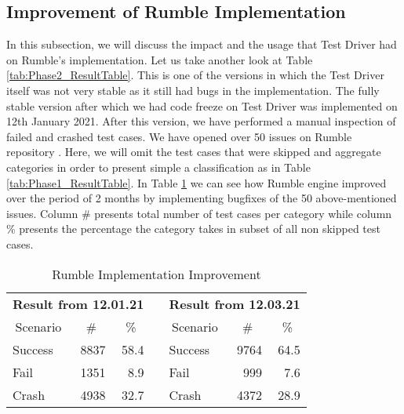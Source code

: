 \subsection{Improvement of Rumble Implementation}
In this subsection, we will discuss the impact and the usage that Test Driver had on Rumble's implementation. Let us take another look at Table \ref{tab:Phase2_ResultTable}. This is one of the versions in which the Test Driver itself was not very stable as it still had bugs in the implementation. The fully stable version after which we had code freeze on Test Driver was implemented on 12th January 2021. After this version, we have performed a manual inspection of failed and crashed test cases. We have opened over 50 issues on Rumble repository \cite{IssuesSubmitted}. Here, we will omit the test cases that were skipped and aggregate categories in order to present simple a classification as in Table \ref{tab:Phase1_ResultTable}. In Table \ref{tab:bugsimprovement} we can see how Rumble engine improved over the period of 2 months by implementing bugfixes of the 50 above-mentioned issues. Column \# presents total number of test cases per category while column \% presents the percentage the category takes in subset of all non skipped test cases.
 
\begin{table}[h!]
	\vspace{-4mm}
	\centering
	\begin{tabular}{|l|r|r|r|l|r|r|}
		\cline{1-3} \cline{5-7}
		\multicolumn{3}{|c|}{\textbf{Result from 12.01.21}}                                & \multicolumn{1}{l|}{}          & \multicolumn{3}{c|}{\textbf{Result from 12.03.21}}                                \\ \cline{1-3} \cline{5-7} 
		\multicolumn{1}{|c|}{Scenario} & \multicolumn{1}{c|}{\#} & \multicolumn{1}{c|}{\%} & \multicolumn{1}{c|}{\textbf{}} & \multicolumn{1}{c|}{Scenario} & \multicolumn{1}{c|}{\#} & \multicolumn{1}{c|}{\%} \\ \cline{1-3} \cline{5-7} 
		Success                        & 8837                    & 58.4                    &                                & Success                       & 9764                    & 64.5                    \\ \cline{1-3} \cline{5-7} 
		Fail                           & 1351                    & 8.9                     &                                & Fail                          & 999                     & 7.6                     \\ \cline{1-3} \cline{5-7} 
		Crash                          & 4938                    & 32.7                    &                                & Crash                         & 4372                    & 28.9                    \\ \cline{1-3} \cline{5-7} 
	\end{tabular}
	\caption{Rumble Implementation Improvement}
	\label{tab:bugsimprovement}
	\vspace{-5mm}
\end{table}

